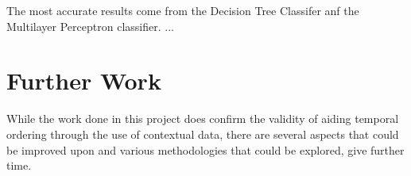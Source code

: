 \documentclass[bsc,frontabs,twoside,singlespacing,parskip,deptreport]{infthesis}     %
\begin{document}
The most accurate results come from the Decision Tree Classifer anf the Multilayer Perceptron classifier.
...
%
%
%
%
%
%
%
\section{Further Work}
While the work done in this project does confirm the validity of aiding temporal ordering through the use of contextual
data, there are several aspects that could be improved upon and various methodologies that could be explored, give further
time.
\end{document}
